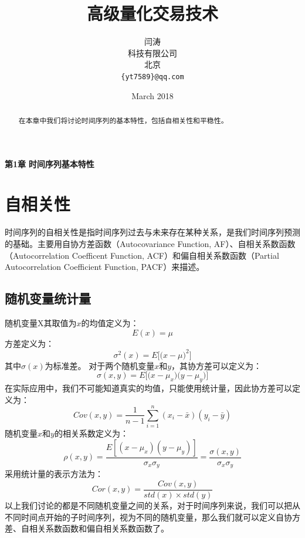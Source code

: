\documentclass{article}
\title{高级量化交易技术}
\author{
  闫涛 \\
  科技有限公司\\
  北京 \\
  \texttt{\{yt7589\}@qq.com} \\
}
\date{March 2018}
\begin{document}
\maketitle
\begin{center}
\Large \textbf{第1章} \quad \textbf{时间序列基本特性}
\end{center}
\begin{abstract}
在本章中我们将讨论时间序列的基本特性，包括自相关性和平稳性。
\end{abstract}
\section{自相关性}
时间序列的自相关性是指时间序列过去与未来存在某种关系，是我们时间序列预测的基础。主要用自协方差函数（Autocovariance Function, AF）、自相关系数函数（Autocorrelation Coefficent Function, ACF）和偏自相关系数函数（Partial Autocorrelation Coefficient Function, PACF）来描述。
\subsection{随机变量统计量}
随机变量X其取值为$x$的均值定义为：
\begin{equation}
E(x) = \mu
\label{e000001}
\end{equation}
方差定义为：
\begin{equation}
\sigma ^{2} (x) = E\bigg[ \big( x - \mu \big)^{2} \bigg]
\label{e000002}
\end{equation}
其中$\sigma (x)$为标准差。
对于两个随机变量$x$和$y$，其协方差可以定义为：
\begin{equation}
\sigma (x, y) = E\bigg[ \big( x - \mu _{x} \big) \big( y - \mu _{y} \big) \bigg]
\label{e000003}
\end{equation}
在实际应用中，我们不可能知道真实的均值，只能使用统计量，因此协方差可以定义为：
\begin{equation}
Cov(x, y) = \frac{1}{n-1} \sum_{i=1}^{n} (x_{i} - \bar{x})(y_{i} - \bar{y})
\label{e000004}
\end{equation}
随机变量$x$和$y$的相关系数定义为：
\begin{equation}
\rho(x,y)=\frac{E[(x-\mu_{x})(y-\mu_{y})]}{\sigma _{x} \sigma _{y}}=\frac{\sigma(x,y)}{\sigma _{x} \sigma _{y}}
\label{e000005}
\end{equation}
采用统计量的表示方法为：
\begin{equation}
Cor(x,y)=\frac{Cov(x,y)}{std(x) \times std(y)}
\label{e000006}
\end{equation}
以上我们讨论的都是不同随机变量之间的关系，对于时间序列来说，我们可以把从不同时间点开始的子时间序列，视为不同的随机变量，那么我们就可以定义自协方差、自相关系数函数和偏自相关系数函数了。\newline
\end{document}
